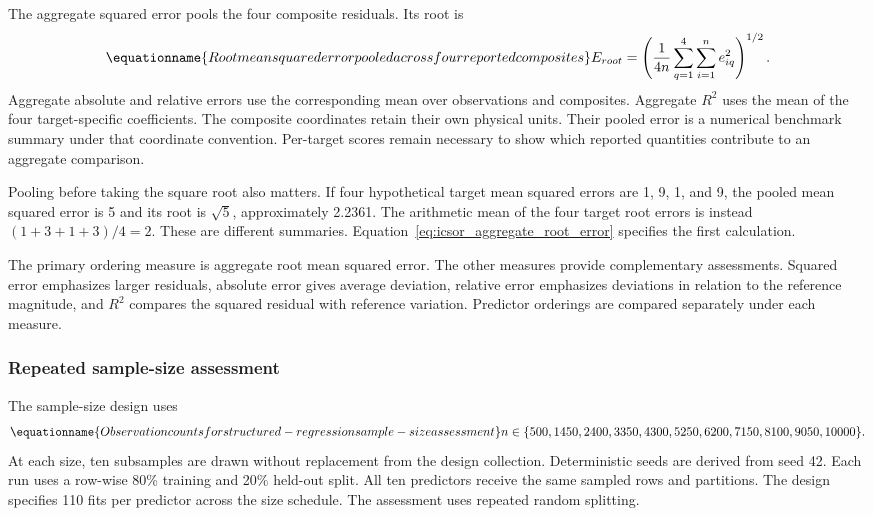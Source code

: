 The aggregate squared error pools the four composite residuals. Its root is
\begin{equation}
\equationname{Root mean squared error pooled across four reported composites}
\label{eq:icsor_aggregate_root_error}
E_{root}=\left(\frac{1}{4n}\sum_{q=1}^{4}\sum_{i=1}^{n}e_{iq}^{2}\right)^{1/2}.
\end{equation}
Aggregate absolute and relative errors use the corresponding mean over observations and composites. Aggregate \(R^2\) uses the mean of the four target-specific coefficients. The composite coordinates retain their own physical units. Their pooled error is a numerical benchmark summary under that coordinate convention. Per-target scores remain necessary to show which reported quantities contribute to an aggregate comparison.

Pooling before taking the square root also matters. If four hypothetical target mean squared errors are 1, 9, 1, and 9, the pooled mean squared error is 5 and its root is \(\sqrt5\), approximately 2.2361. The arithmetic mean of the four target root errors is instead \((1+3+1+3)/4=2\). These are different summaries. Equation~\eqref{eq:icsor_aggregate_root_error} specifies the first calculation.

The primary ordering measure is aggregate root mean squared error. The other measures provide complementary assessments. Squared error emphasizes larger residuals, absolute error gives average deviation, relative error emphasizes deviations in relation to the reference magnitude, and \(R^2\) compares the squared residual with reference variation. Predictor orderings are compared separately under each measure.

\subsubsection{Repeated sample-size assessment}

The sample-size design uses
\begin{equation}
\equationname{Observation counts for structured-regression sample-size assessment}
\label{eq:icsor_assessment_sizes}
n\in\{500,1450,2400,3350,4300,5250,6200,7150,8100,9050,10000\}.
\end{equation}
At each size, ten subsamples are drawn without replacement from the design collection. Deterministic seeds are derived from seed 42. Each run uses a row-wise 80\% training and 20\% held-out split. All ten predictors receive the same sampled rows and partitions. The design specifies 110 fits per predictor across the size schedule. The assessment uses repeated random splitting.

